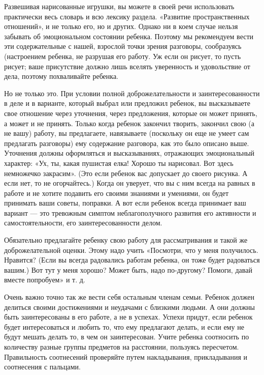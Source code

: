 \documentclass[a5paper]{book}
\begin{document}
Развешивая нарисованные игрушки, вы можете в своей речи использовать
практически весь словарь и всю лексику раздела. «Развитие
пространственных отношений», и не только его, но и других. Однако ни в
коем случае нельзя забывать об эмоциональном состоянии ребенка. Поэтому
мы рекомендуем вести эти содержательные с нашей, взрослой точки зрения
разговоры, сообразуясь (настроением ребенка, не разрушая его работу. Уж
если он рисует, то пусть рисует; ваше присутствие должно лишь вселять
уверенность и удовольствие от дела, поэтому похваливайте ребенка.

Но не только это. При условии полной доброжелательности и
заинтересованности в деле и в варианте, который выбрал или предложил
ребенок, вы высказываете свое отношение через уточнения, через
предложения, которые он может принять, а может и не принять. Только
когда ребенок закончил творить, закончил свою (а не вашу) работу, вы
предлагаете, навязываете (поскольку он еще не умеет сам предлагать
разговоры) ему содержание разговора, как это было описано выше.
Уточнения должны оформляться и высказываниях, отражающих эмоциональный
характер: «Ух, ты, какая пушистая елка! Хорошо ты нарисовал. Вот здесь
немножечко закрасим». (Это если ребенок вас допускает до своего рисунка.
А если нет, то не огорчайтесь.) Когда он уверует, что вы с ним всегда на
равных в работе и не хотите подавить его своими знаниями и умениями, он
будет принимать ваши советы, поправки. А вот если ребенок всегда
принимает ваш вариант --- это тревожным симптом неблагополучного
развития его активности и самостоятельности, его заинтересованности
делом.

Обязательно предлагайте ребенку свою работу для рассматривания и такой
же доброжелательной оценки. Этому надо учить «Посмотри, что у меня
получилось. Нравится? (Если вы всегда радовались работам ребенка, он
тоже будет радоваться вашим.) Вот тут у меня хорошо? Может быть, надо
по-другому? Помоги, давай вместе попробуем» и т. д.

Очень важно точно так же вести себя остальным членам семьи. Ребенок
должен делиться своими достижениями и неудачами с близкими людьми. А они
должны быть заинтересованы в его работе, а не в успехах. Успехи придут,
если ребенок будет интересоваться и любить то, что ему предлагают
делать, и если ему не будут мешать делать то, в чем он заинтересован.
Учите ребенка соотносить по количеству разные группы предметов на
расстоянии, пользуясь пересчетом. Правильность соотнесений проверяйте
путем накладывания, прикладывания и соотнесения с пальцами.
\end{document}
